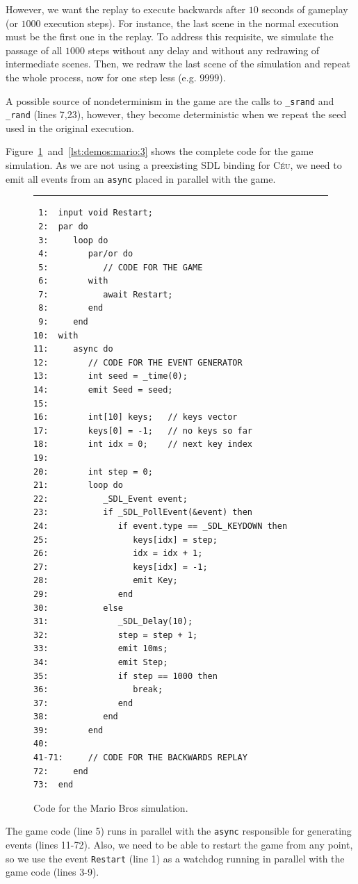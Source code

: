 \documentclass{sigplan-proc}
\newcommand{\2}{\;\;}
\newcommand{\5}{\;\;\;\;\;}
\newcommand{\CEU}{\textsc{C\'{e}u}}
\newcommand{\code}[1] {{\small{\texttt{#1}}}}
\begin{document}
However, we want the replay to execute backwards after $10$ seconds of gameplay 
(or $1000$ execution steps).
For instance, the last scene in the normal execution must be the first one in 
the replay.
To address this requisite, we simulate the passage of all $1000$ steps without 
any delay and without any redrawing of intermediate scenes.
Then, we redraw the last scene of the simulation and repeat the whole process, 
now for one step less (e.g. $9999$).

A possible source of nondeterminism in the game are the calls to \code{\_srand} 
and \code{\_rand} (lines 7,23), however, they become deterministic when we 
repeat the seed used in the original execution.

Figure~\ref{lst:demos:mario:2}~and~\ref{lst:demos:mario:3} shows the complete 
code for the game simulation.
As we are not using a preexisting SDL binding for \CEU{}, we need to emit all 
events from an \code{async} placed in parallel with the game.

\begin{figure}[t]
\rule{8.5cm}{0.37pt}
{\small
\begin{verbatim}
 1:  input void Restart;
 2:  par do
 3:     loop do
 4:        par/or do
 5:           // CODE FOR THE GAME
 6:        with
 7:           await Restart;
 8:        end
 9:     end
10:  with
11:     async do
12:        // CODE FOR THE EVENT GENERATOR
13:        int seed = _time(0);
14:        emit Seed = seed;
15:
16:        int[10] keys;   // keys vector
17:        keys[0] = -1;   // no keys so far
18:        int idx = 0;    // next key index
19:
20:        int step = 0;
21:        loop do
22:           _SDL_Event event;
23:           if _SDL_PollEvent(&event) then
24:              if event.type == _SDL_KEYDOWN then
25:                 keys[idx] = step;
26:                 idx = idx + 1;
27:                 keys[idx] = -1;
28:                 emit Key;
29:              end
30:           else
31:              _SDL_Delay(10);
32:              step = step + 1;
33:              emit 10ms;
34:              emit Step;
35:              if step == 1000 then
36:                 break;
37:              end
38:           end
39:        end
40:
41-71:     // CODE FOR THE BACKWARDS REPLAY
72:     end
73:  end
\end{verbatim}
}
\caption{ Code for the Mario Bros simulation.
\label{lst:demos:mario:2}
}
\end{figure}

The game code (line 5) runs in parallel with the \code{async} responsible for 
generating events (lines 11-72).
Also, we need to be able to restart the game from any point, so we use the 
event \code{Restart} (line 1) as a watchdog running in parallel with the game 
code (lines 3-9).
\end{document}
